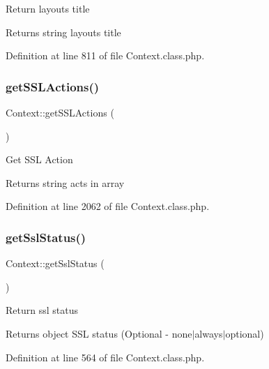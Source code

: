 Return layout\textquotesingle{}s title \begin{DoxyReturn}{Returns}
string layout\textquotesingle{}s title 
\end{DoxyReturn}


Definition at line 811 of file Context.\+class.\+php.

\hypertarget{classContext_a10b68bdba6f55bc725c352aad7844dc7}{}\label{classContext_a10b68bdba6f55bc725c352aad7844dc7} 
\subsubsection{\texorpdfstring{get\+S\+S\+L\+Actions()}{getSSLActions()}}
{\footnotesize\ttfamily Context\+::get\+S\+S\+L\+Actions (\begin{DoxyParamCaption}{ }\end{DoxyParamCaption})}

Get S\+SL Action

\begin{DoxyReturn}{Returns}
string acts in array 
\end{DoxyReturn}


Definition at line 2062 of file Context.\+class.\+php.

\hypertarget{classContext_a284a60296c1f3df3adbe3395769fa883}{}\label{classContext_a284a60296c1f3df3adbe3395769fa883} 
\subsubsection{\texorpdfstring{get\+Ssl\+Status()}{getSslStatus()}}
{\footnotesize\ttfamily Context\+::get\+Ssl\+Status (\begin{DoxyParamCaption}{ }\end{DoxyParamCaption})}

Return ssl status

\begin{DoxyReturn}{Returns}
object S\+SL status (Optional -\/ none$\vert$always$\vert$optional) 
\end{DoxyReturn}


Definition at line 564 of file Context.\+class.\+php.

\hypertarget{classContext_aa60b75d32d4923bb3b9854985a82ce36}{}\label{classContext_aa60b75d32d4923bb3b9854985a82ce36} 
